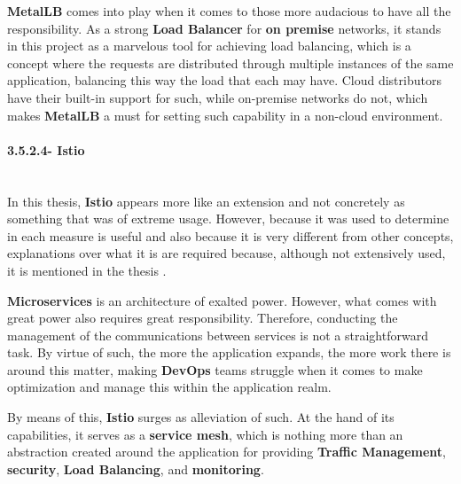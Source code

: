 \textbf{MetalLB} comes into play when it comes to those more audacious to have all the responsibility. As a strong \textbf{Load Balancer} 
for \textbf{on premise} networks, it stands in this project as a marvelous tool for achieving load balancing, which is a concept 
where the requests are distributed through multiple instances of the same application, balancing this way the load that each may have. Cloud 
distributors have their built-in support for such, while on-premise networks do not, which makes \textbf{MetalLB} a must for setting 
such capability in a non-cloud environment.

\paragraph{3.5.2.4- Istio}\mbox{}\\
In this thesis, \textbf{Istio} appears more like an extension and not concretely as something that was of extreme usage. However,
because it was used to determine in each measure is useful and also because it is very different from other concepts, explanations 
over what it is are required because, although not extensively used, it is mentioned in the thesis \cite{istio}.

\textbf{Microservices} is an architecture of exalted power. However, what comes with great power also requires great responsibility. Therefore, 
conducting the management of the communications between services is not a straightforward task. By virtue of such, the more 
the application expands, the more work there is around this matter, making \textbf{DevOps} teams struggle when it comes to make 
optimization and manage this within the application realm.

By means of this, \textbf{Istio} surges as alleviation of such. At the hand of its capabilities, it serves as a \textbf{service mesh}, which 
is nothing more than an abstraction created around the application for providing \textbf{Traffic Management}, \textbf{security}, 
\textbf{Load Balancing}, and \textbf{monitoring}.

